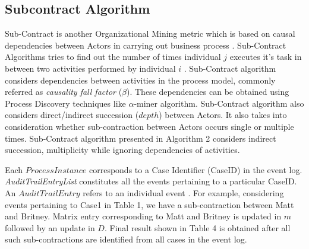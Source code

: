 \documentclass[11pt]{article}
\begin{document}


\subsection{Subcontract Algorithm}
\par{Sub-Contract is another Organizational Mining metric  which is based on causal dependencies between Actors in carrying out business process \cite{aalst}. Sub-Contract Algorithms tries to find out the number of times individual $j$ executes it's task in between two activities performed by individual $i$ \cite{aalst}. Sub-Contract algorithm considers dependencies between activities in the process model, commonly referred as \textit{causality fall factor} ($\beta$). These dependencies can be obtained using Process Discovery techniques like $\alpha$-miner algorithm. Sub-Contract algorithm also considers direct/indirect succession ($depth$) between Actors. It also takes into consideration whether sub-contraction between Actors occurs single or multiple times. Sub-Contract algorithm presented in Algorithm 2 considers indirect succession, multiplicity while ignoring dependencies of activities.}
\par{Each $Process Instance$ corresponds to a Case Identifier (CaseID) in the event log. \textit{AuditTrailEntryList} constitutes all the events pertaining to a particular CaseID. An $AuditTrailEntry$ refers to an individual event \cite{mxml}. For example, considering events pertaining to Case1 in Table 1, we have a sub-contraction between Matt and Britney. Matrix entry corresponding to Matt and Britney is updated in $m$ followed by an update in $D$. Final result shown in Table 4 is obtained after all such sub-contractions are identified from all cases in the event log.}
\renewcommand{\arraystretch}{.5}
\end{document}
